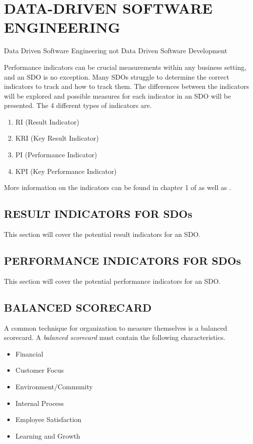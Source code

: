 \documentclass[SDSUThesis.tex]{subfiles}
\begin{document}
\section{DATA-DRIVEN SOFTWARE ENGINEERING}

Data Driven Software Engineering not Data Driven Software Development

Performance indicators can be crucial measurements
within any business setting, and an SDO is no exception. Many
SDOs struggle to determine the correct indicators to track and
how to track them.  
The differences between the indicators will be explored and
possible measures for each indicator in an SDO will be
presented.  The 4 different types of indicators are.
\begin{enumerate}
  \item RI (Result Indicator)
  \item KRI (Key Result Indicator)
  \item PI (Performance Indicator)
  \item KPI (Key Performance Indicator)
\end{enumerate}

More information on the indicators can be found
in chapter 1 of \cite{parmenter2010}
as well as \cite{florac1999,kaplan1992,letier2013}.

\subsection{RESULT INDICATORS FOR SDOs}
    This section will cover the potential result indicators for an SDO.

\subsection{PERFORMANCE INDICATORS FOR SDOs}
    This section will cover the potential performance indicators for an SDO.
    

\subsection{BALANCED SCORECARD}

A common technique for organization to measure themselves is a balanced scorecard.
A \textit{balanced scorecard} must contain the following
characteristics.
\begin{itemize}
  \item Financial 
  \item Customer Focus
  \item Environment/Community
  \item Internal Process
  \item Employee Satisfaction
  \item Learning and Growth
\end{itemize}
\end{document}

